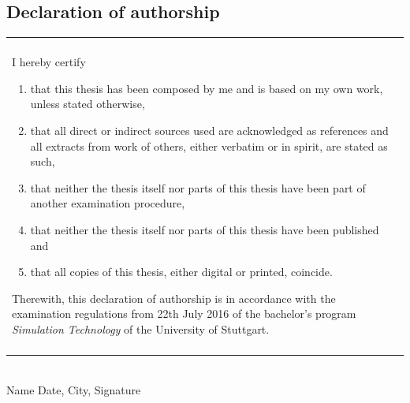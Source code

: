 \documentclass[twoside,a4paper]{article}
\begin{document}
%
%
\clearpage\newpage\null %
\newpage
\begin{appendices}

\section{Declaration of authorship}

\vspace{3cm}

\begin{table}[h!]
\centering
\begin{tabular}{|p{13cm}|}
\hline\\
	I hereby certify
	\begin{enumerate}
		\item that this thesis has been composed by me and is based on my own work, unless stated otherwise,
		\item that all direct or indirect sources used are acknowledged as references and all extracts from work of others, either verbatim or in spirit, are stated as such,
		\item that neither the thesis itself nor parts of this thesis have been part of another examination procedure,
		\item that neither the thesis itself nor parts of this thesis have been published and
		\item that all copies of this thesis, either digital or printed, coincide.
	\end{enumerate}
	Therewith, this declaration of authorship is in accordance with the examination regulations from 22th July 2016 of the bachelor's program \emph{Simulation Technology} of the University of Stuttgart.\\\\
\hline
\end{tabular}
\end{table}

\vspace{4cm}
\hrulefill\\
Name
\hspace{7cm}
Date, City, Signature
\end{appendices}
%
%
\clearpage\newpage\null %
\newpage
{}


\end{document}
